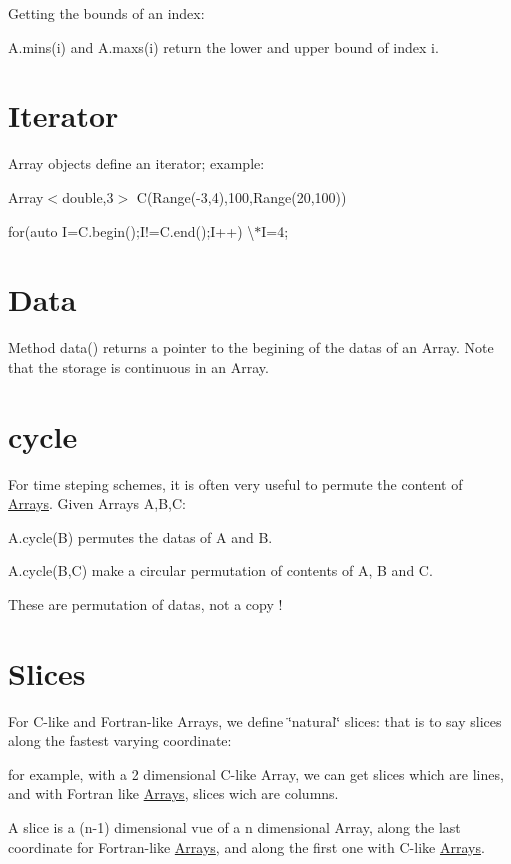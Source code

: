 \begin{DoxyItemize}
\item Getting the bounds of an index\+:
\end{DoxyItemize}

A.\+mins(i) and A.\+maxs(i) return the lower and upper bound of index i.\hypertarget{index_Iterator}{}\section{Iterator}\label{index_Iterator}
Array objects define an iterator; example\+:

Array$<$double,3$>$ C(Range(-\/3,4),100,Range(20,100))

for(auto I=C.\+begin();I!=C.\+end();I++) \textbackslash{}$\ast$\+I=4;\hypertarget{index_Data}{}\section{Data}\label{index_Data}
Method data() returns a pointer to the begining of the datas of an Array. Note that the storage is continuous in an Array.\hypertarget{index_cycle}{}\section{cycle}\label{index_cycle}
For time steping schemes, it is often very useful to permute the content of \hyperlink{namespaceArrays}{Arrays}. Given Array\textquotesingle{}s A,B,C\+:

A.\+cycle(\+B) permutes the datas of A and B.

A.\+cycle(\+B,\+C) make a circular permutation of contents of A, B and C.

These are permutation of datas, not a copy !\hypertarget{index_Slices}{}\section{Slices}\label{index_Slices}
For C-\/like and Fortran-\/like Array\textquotesingle{}s, we define \char`\"{}natural\char`\"{} slices\+: that is to say slices along the fastest varying coordinate\+:

for example, with a 2 dimensional C-\/like Array, we can get slices which are lines, and with Fortran like \hyperlink{namespaceArrays}{Arrays}, slices wich are columns.

A slice is a (n-\/1) dimensional vue of a n dimensional Array, along the last coordinate for Fortran-\/like \hyperlink{namespaceArrays}{Arrays}, and along the first one with C-\/like \hyperlink{namespaceArrays}{Arrays}.

